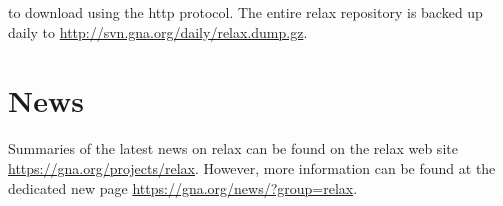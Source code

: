 to download using the http protocol.  The entire relax repository is backed up daily to \href{http://svn.gna.org/daily/relax.dump.gz}{http://svn.gna.org/daily/relax.dump.gz}.




\section{News}

Summaries of the latest news on relax can be found on the relax web site \href{https://gna.org/projects/relax}{https://gna.org/projects/relax}.  However, more information can be found at the dedicated new page \href{https://gna.org/news/?group=relax}{https://gna.org/news/?group=relax}.
